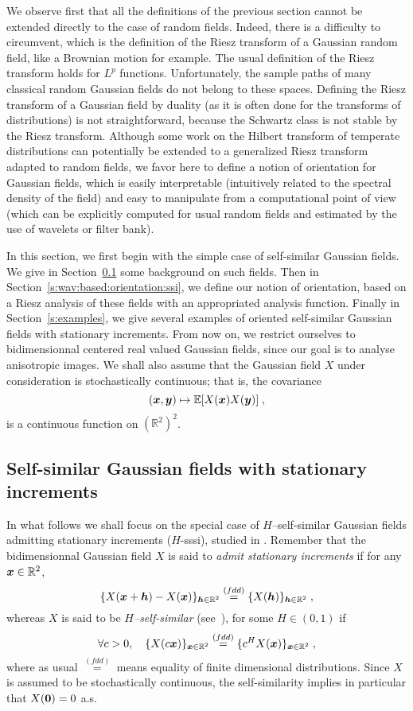 \documentclass{elsarticle}
\def\vx{\vect{x}}
\def\vh{\vect{h}}
\begin{document}
We observe first that all the definitions of the previous section cannot be extended directly to the case of random fields. Indeed, there is a difficulty to circumvent, which is the definition of the Riesz transform of a Gaussian random field, like a Brownian motion for example. The usual definition of the Riesz transform holds for $L^p$ functions. Unfortunately, the sample paths of many classical random Gaussian fields do not belong to these spaces. Defining the Riesz transform of a Gaussian field by duality (as it is often done for the transforms of distributions) is not straightforward, because the Schwartz class is not stable by the Riesz transform. Although some work on the Hilbert transform of temperate distributions \cite{ishikawa1985generalized,koizumi1959hilbert} can potentially be extended to a generalized Riesz transform adapted to random fields, we favor here to define a notion of orientation for Gaussian fields, which is easily interpretable (intuitively related to the spectral density of the field) and easy to manipulate from a computational point of view (which can be explicitly computed for usual random fields and estimated by the use of wavelets or filter bank). 

In this section, we first begin with the simple case of self-similar Gaussian fields. We give in Section~\ref{s:self-similar:def} some background on such fields. Then in Section~\ref{s:wav:based:orientation:ssi}, we define our notion of orientation, based on a Riesz analysis of these fields with an appropriated analysis function. Finally in Section~\ref{s:examples}, we give several examples of oriented self-similar Gaussian fields with stationary increments. From now on, we restrict ourselves to bidimensionnal centered real valued Gaussian fields, since our goal is to analyse anisotropic images. We shall also assume that the Gaussian field $X$ under consideration is stochastically continuous; that is, the covariance
\[
(\bm{x},\bm{y})\mapsto \mathbb{E}[X(\bm{x})X(\bm{y})]\;,
\]
is a continuous function on $(\mathbb{R}^2)^2$.
\subsection{Self-similar Gaussian fields with stationary increments\\}\label{s:self-similar:def}

In what follows we shall focus on the special case of $H$--self-similar Gaussian fields admitting stationary increments ($H$-sssi), studied in \cite{Do79, BJR97, bonami2003anisotropic}. Remember that the bidimensionnal Gaussian field $X$ is said to {\it admit stationary increments} if for any $\vx\in\mathbb{R}^2$,
\[
\{X(\vx+\vh)-X(\vx)\}_{\vh\in\mathbb{R}^2}\overset{(fdd)}{=}\{X(\vh)\}_{\vh\in\mathbb{R}^2}\;,
\]
whereas $X$ is said to be {\it $H$--self-similar} (see~\cite{Do79}), for some $H\in (0,1)$ if
\[
\forall c>0,\quad \{X(c\vx)\}_{\vect{x}\in\mathbb{R}^2}\overset{(fdd)}{=}\{ c^H X(\vx)\}_{\vx\in\mathbb{R}^2}\;,
\]
where as usual $\overset{(fdd)}{=}$ means equality of finite dimensional distributions. Since $X$ is assumed to be stochastically continuous, the self-similarity implies in particular that $X(\bm{0})=0$ a.s.
\end{document}
